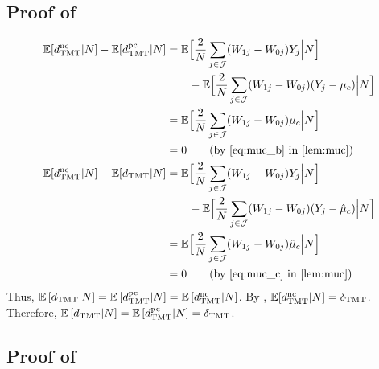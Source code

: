 \documentclass[12pt]{extarticle}
\newcommand{\E}{\mathbb{E}}
\newcommand{\tmt}{{\normalfont \text{TMT}}}
\newcommand{\dtmtnc}{d_{\tmt}^{\normalfont \text{nc}}}
\newcommand{\dtmtpc}{d_{\tmt}^{\normalfont \text{pc}}}
\newcommand{\cJ}{\mathcal{J}}
\begin{document}
{\subsection{Proof of } \label{app:unbiased_dtmt_estimand}

{\allowdisplaybreaks
\begin{align*}
\E[\dtmtnc|N] - \E[\dtmtpc|N] &= \E\Big[\frac{2}{N}\sum_{j\in \cJ}(W_{1j}-W_{0j})Y_j\Big|N\Big] ~ \nonumber \\
& \qquad - \E\Big[\frac{2}{N}\sum_{j\in \cJ}(W_{1j}-W_{0j})(Y_j-\mu_c)\Big|N\Big] \nonumber \\
&= \E\Big[\frac{2}{N}\sum_{j\in \cJ}(W_{1j}-W_{0j})\mu_c\Big|N\Big] \nonumber \\
&= 0 \qquad (\text{by \Cref{eq:muc_b} in \Cref{lem:muc}}) \nonumber \\
\E[\dtmtnc|N] - \E[d_{\tmt}|N] &= \E\Big[\frac{2}{N}\sum_{j\in \cJ}(W_{1j}-W_{0j})Y_j\Big|N\Big] ~ \nonumber \\
& \qquad - \E\Big[\frac{2}{N}\sum_{j\in \cJ}(W_{1j}-W_{0j})(Y_j-\hat{\mu}_c)\Big|N\Big] \nonumber \\
&= \E\Big[\frac{2}{N}\sum_{j\in \cJ}(W_{1j}-W_{0j})\hat{\mu}_c\Big|N\Big] \nonumber \\
&= 0 \qquad (\text{by \Cref{eq:muc_c} in \Cref{lem:muc}})
\end{align*}}Thus, $\E \left[ d_{\tmt} | N \right] = \E \left[ \dtmtpc | N \right] = \E \left[ \dtmtnc | N \right]$. By , $\E[\dtmtnc | N]=\delta_{\tmt}$. Therefore, $\E \left[ d_{\tmt} | N \right] = \E \left[ \dtmtpc | N \right] = \delta_{\tmt}$.


\subsection{Proof of } \label{app:cov_aj_ak}

}
\end{document}
